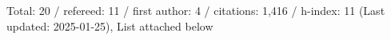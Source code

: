 Total: 20 / refereed: 11 / first author: 4 / citations: 1,416 / h-index: 11 (Last updated: 2025-01-25), List attached below